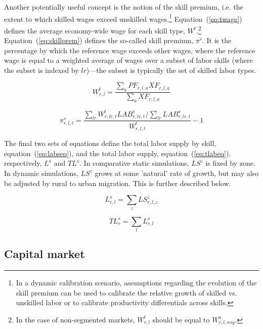 \documentclass[11pt,letterpaper]{report}
\begin{document}
Another potentially useful concept is the notion of the skill premium, i.e. the
extent to which skilled wages exceed unskilled wages.\footnote{In a dynamic
calibration scenario, assumptions regarding the evolution of the skill premium
can be used to calibrate the relative growth of skilled vs. unskilled labor or
to calibrate productivity differentials across skills.}
Equation~(\ref{eq:twage}) defines the average economy-wide wage for each skill
type, $W^t$.\footnote{In the case of non-segmented markets, $W^t_{r,l}$ should
be equal to $W^a_{r,l,\mathit{nsg}}$.} Equation~(\ref{eq:skillprem}) defines the
so-called skill premium,  $\pi^s$. It is the percentage by which the reference
wage exceeds other wages, where the reference wage is equal to a weighted
average of wages over a subset of labor skills (where the subset is indexed by
$\mathit{lr}$)---the subset is typically the set of skilled labor types.

\begin{equation}
\label{eq:twage}
W^t_{r,l} =
   \displaystyle \frac{\sum_{a}{\mathit{PF}_{r,l,a} \mathit{XF}_{r,l,a}}}
      {\sum_{a}{\mathit{XF}_{r,l,a}}}
\end{equation}

\begin{equation}
\label{eq:skillprem}
\pi^s_{r,l,t} =
   \frac {  \sum_{\mathit{lr}} {
               W^t_{r,\mathit{lr},t}\mathit{LAB}^s_{r,\mathit{lr},t}
            }
   /  \sum_{\mathit{lr}} {
         \mathit{LAB}^s_{r,\mathit{lr},t}
      } } {W^t_{r,\mathit{l},t} } - 1
\end{equation}

The final two sets of equations define the total labor supply by skill,
equation~(\ref{eq:labseq}), and the total labor supply,
equation~(\ref{eq:tlabeq}), respectively, $\mathit{L}^s$ and $\mathit{TL}^s$. In
comparative static simulations, $\mathit{LS}^z$ is fixed by zone. In dynamic
simulations, $\mathit{LS}^z$ grows at some 'natural' rate of growth, but may
also be adjusted by rural to urban migration. This is further described below.

\begin{equation}
\label{eq:labseq}
\mathit{L}^s_{r,l} = \sum_z{\mathit{LS}^z_{r,l,z}}
\end{equation}

\begin{equation}
\label{eq:tlabeq}
\mathit{TL}^s_{r} = \sum_l{\mathit{L}^s_{r,l}}
\end{equation}

\subsection{Capital market}
\end{document}

